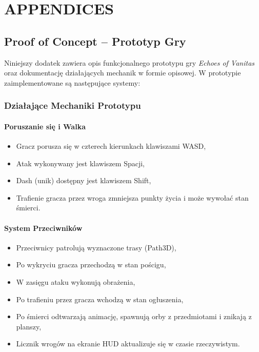 
\part*{APPENDICES}

\chapter{Proof of Concept – Prototyp Gry}
\label{appA}

Niniejszy dodatek zawiera opis funkcjonalnego prototypu gry \textit{Echoes of Vanitas} oraz dokumentację działających mechanik w formie opisowej. W prototypie zaimplementowane są następujące systemy:

\section{Działające Mechaniki Prototypu}

\subsection{Poruszanie się i Walka}
\begin{itemize}
    \item Gracz porusza się w czterech kierunkach klawiszami WASD,
    \item Atak wykonywany jest klawiszem Spacji,
    \item Dash (unik) dostępny jest klawiszem Shift,
    \item Trafienie gracza przez wroga zmniejsza punkty życia i może wywołać stan śmierci.
\end{itemize}

\subsection{System Przeciwników}
\begin{itemize}
    \item Przeciwnicy patrolują wyznaczone trasy (Path3D),
    \item Po wykryciu gracza przechodzą w stan pościgu,
    \item W zasięgu ataku wykonują obrażenia,
    \item Po trafieniu przez gracza wchodzą w stan ogłuszenia,
    \item Po śmierci odtwarzają animację, spawnują orby z przedmiotami i znikają z planszy,
    \item Licznik wrogów na ekranie HUD aktualizuje się w czasie rzeczywistym.
\end{itemize}

